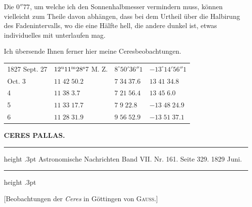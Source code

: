 Die $0''77$, um welche ich den Sonnenhalbmesser vermindern muss, können vielleicht zum Theile davon abhängen, dass bei dem Urtheil über die Halbirung des Fadenintervalls, wo die eine Hälfte hell, die andere dunkel ist, etwas individuelles mit unterlaufen mag.

Ich übersende Ihnen ferner hier meine Ceresbeobachtungen.

\begin{center}
\begin{tabular}{l|l|l|l}
1827 Sept. 27 & $12^{\rm u}11^{\rm m}28^{\rm s}7$ M. Z. & $8^\circ50'36''1$ & $-13^\circ14'56''1$ \\
\hfill Oct. 3 & $11\;42\;50.2$ & $7\;34\;37.6$ & $13\;41\;34.8$ \\
\hfill 4 & $11\;38\;3.7$ & $7\;21\;56.4$ & $13\;45\;6.0$ \\
\hfill 5 & $11\;33\;17.7$ & $7\;9\;22.8$ & $-13\;48\;24.9$ \\
\hfill 6 & $11\;28\;31.9$ & $9\;56\;52.9$ & $-13\;51\;37.1$ \\
\end{tabular}
\end{center}

\clearpage
\thispagestyle{empty}
\noindent{}%
%
\parbox[t]{\dimexpr\linewidth-24mm\relax}{\centering\footnotesize\bfseries CERES PALLAS.\par}%
\makebox[12mm][r]{}\par\nobreak\medskip
\begin{center}
\parbox{.72\linewidth}{%
\centering\small
\hrule height .3pt\relax\vspace{2.5pt}
Astronomische Nachrichten Band VII. Nr. 161. Seite 329. 1829 Juni.\par
\vspace{2.5pt}\hrule height .3pt\relax
}
\end{center}

\begin{center}[Beobachtungen der \emph{Ceres} in Göttingen von \textsc{Gauss.}]\end{center}

